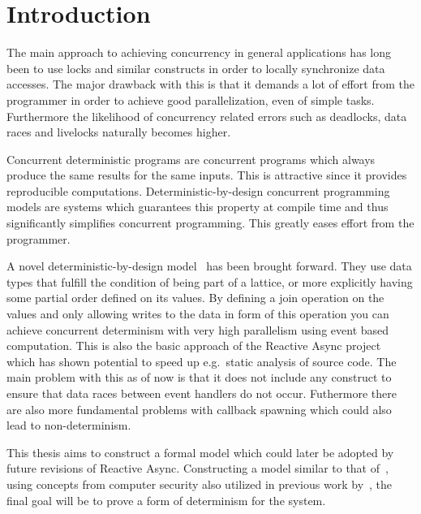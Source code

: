 \chapter{Introduction}
\label{cha:introduction}

The main approach to achieving concurrency in general applications has long been
to use locks and similar constructs in order to locally synchronize data
accesses. The major drawback with this is that it demands a lot of effort from
the programmer in order to achieve good parallelization, even of simple tasks.
Furthermore the likelihood of concurrency related errors such as deadlocks, data
races and livelocks naturally becomes higher. 

Concurrent deterministic programs are concurrent programs which always produce
the same results for the same inputs. This is attractive since it provides
reproducible computations.  Deterministic-by-design concurrent programming
models are systems which guarantees this property at compile time and thus
significantly simplifies concurrent programming. This greatly eases effort
from the programmer. 

A novel deterministic-by-design model~\parencite{kuper2013lvars,
kuper2014freeze} has been brought forward.  They use data types that fulfill the
condition of being part of a lattice, or more explicitly having some partial
order defined on its values. By defining a join operation on the values and only
allowing writes to the data in form of this operation you can achieve concurrent
determinism with very high parallelism using event based computation.  This is
also the basic approach of the Reactive Async
project~\parencite{conf/scala/HallerGES16} which has shown potential to speed up
e.g.\ static analysis of source code. The main problem with this as of now is
that it does not include any construct to ensure that data races between event
handlers do not occur. Futhermore there are also more fundamental problems with
callback spawning which could also lead to non-determinism.

This thesis aims to construct a formal model which could later be adopted by
future revisions of Reactive Async. Constructing a model similar to that
of~\parencite{kuper2014freeze}, using concepts from computer security also
utilized in previous work by~\parencite{conf/oopsla/HallerL16}, the final goal
will be to prove a form of determinism for the system.
